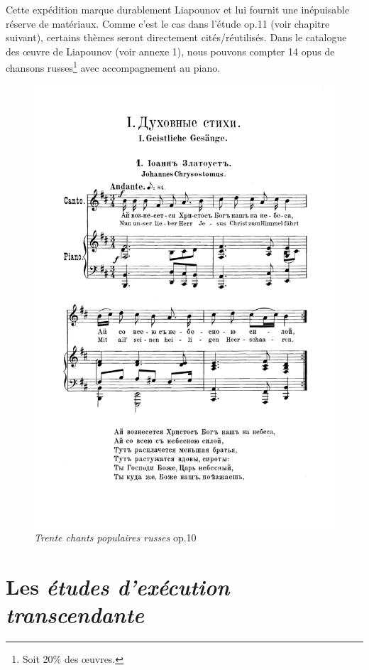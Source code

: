 Cette expédition marque durablement Liapounov et lui fournit une inépuisable réserve de matériaux. Comme c'est le cas dans l'étude op.11  (voir chapitre suivant), certains thèmes seront directement cités/réutilisés. Dans le catalogue des œuvre de Liapounov (voir annexe 1), nous pouvons compter 14 opus de chansons russes\footnote{Soit 20\% des œuvres.} avec accompagnement au piano.

\begin{figure}[!p]
  \includegraphics[width=16cm, keepaspectratio]{chanson.png}
  \caption{\label{chanson}\emph{Trente chants populaires russes} op.10 }
\end{figure}
\newpage

\section{Les \emph{études d'exécution transcendante}}

